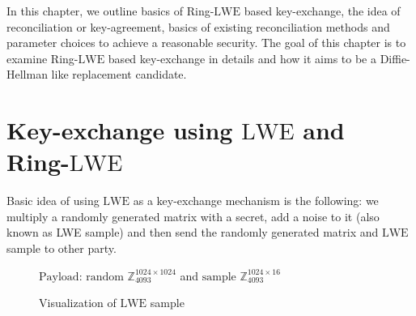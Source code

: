 In this chapter, we outline basics of Ring-$\mathrm{LWE}$ based key-exchange, the idea of reconciliation or key-agreement, basics of existing reconciliation methods and parameter choices to achieve a reasonable security. The goal of this chapter is to examine Ring-$\mathrm{LWE}$ based key-exchange in details and how it aims to be a Diffie-Hellman like replacement candidate.

\section{Key-exchange using \texorpdfstring{$\mathrm{LWE}$}{LWE} and Ring-\texorpdfstring{$\mathrm{LWE}$}{Ring-LWE}}
Basic idea of using $\mathrm{LWE}$ as a key-exchange mechanism is the following: we multiply a randomly generated matrix with a secret, add a noise to it (also known as LWE sample) and then send the randomly generated matrix and $\mathrm{LWE}$ sample to other party.

\begin{figure}[H]
    \centering
%   
\newcommand{\dimension}{1024}
\newcommand{\error}{16}


	

	\caption{Visualization of $\mathrm{LWE}$ sample}
	$\mathrm{Payload}$: $\text{random } \mathbb{Z}^{\dimension \times \dimension}_{4093}$ and $\text{sample } \mathbb{Z}^{\dimension \times \error}_{4093}$
\end{figure}

